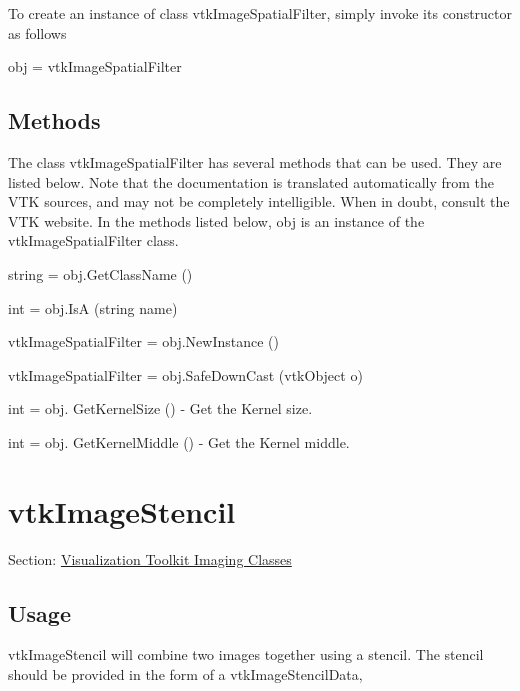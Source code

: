 To create an instance of class vtk\-Image\-Spatial\-Filter, simply invoke its constructor as follows \begin{DoxyVerb}  obj = vtkImageSpatialFilter
\end{DoxyVerb}
 \hypertarget{vtkwidgets_vtkxyplotwidget_Methods}{}\subsection{Methods}\label{vtkwidgets_vtkxyplotwidget_Methods}
The class vtk\-Image\-Spatial\-Filter has several methods that can be used. They are listed below. Note that the documentation is translated automatically from the V\-T\-K sources, and may not be completely intelligible. When in doubt, consult the V\-T\-K website. In the methods listed below, {\ttfamily obj} is an instance of the vtk\-Image\-Spatial\-Filter class. 
\begin{DoxyItemize}
\item {\ttfamily string = obj.\-Get\-Class\-Name ()}  
\item {\ttfamily int = obj.\-Is\-A (string name)}  
\item {\ttfamily vtk\-Image\-Spatial\-Filter = obj.\-New\-Instance ()}  
\item {\ttfamily vtk\-Image\-Spatial\-Filter = obj.\-Safe\-Down\-Cast (vtk\-Object o)}  
\item {\ttfamily int = obj. Get\-Kernel\-Size ()} -\/ Get the Kernel size.  
\item {\ttfamily int = obj. Get\-Kernel\-Middle ()} -\/ Get the Kernel middle.  
\end{DoxyItemize}\hypertarget{vtkimaging_vtkimagestencil}{}\section{vtk\-Image\-Stencil}\label{vtkimaging_vtkimagestencil}
Section\-: \hyperlink{sec_vtkimaging}{Visualization Toolkit Imaging Classes} \hypertarget{vtkwidgets_vtkxyplotwidget_Usage}{}\subsection{Usage}\label{vtkwidgets_vtkxyplotwidget_Usage}
vtk\-Image\-Stencil will combine two images together using a stencil. The stencil should be provided in the form of a vtk\-Image\-Stencil\-Data,

